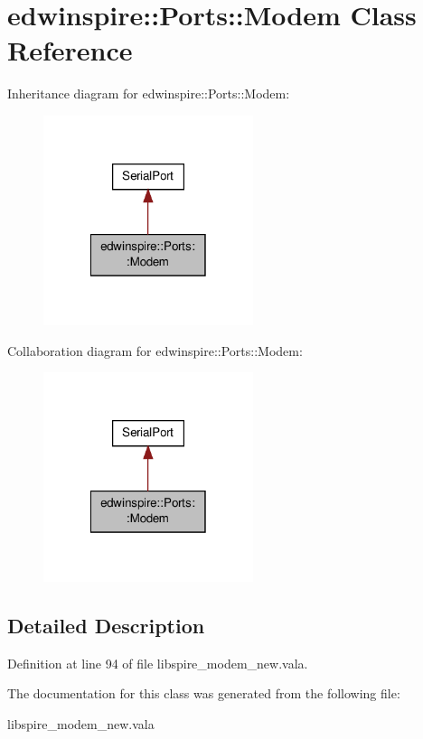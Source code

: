 \hypertarget{classedwinspire_1_1_ports_1_1_modem}{\section{edwinspire\-:\-:Ports\-:\-:Modem Class Reference}
\label{classedwinspire_1_1_ports_1_1_modem}
}


Inheritance diagram for edwinspire\-:\-:Ports\-:\-:Modem\-:\nopagebreak
\begin{figure}[H]
\begin{center}
\leavevmode
\includegraphics[width=174pt]{classedwinspire_1_1_ports_1_1_modem__inherit__graph}
\end{center}
\end{figure}


Collaboration diagram for edwinspire\-:\-:Ports\-:\-:Modem\-:\nopagebreak
\begin{figure}[H]
\begin{center}
\leavevmode
\includegraphics[width=174pt]{classedwinspire_1_1_ports_1_1_modem__coll__graph}
\end{center}
\end{figure}


\subsection{Detailed Description}


Definition at line 94 of file libspire\-\_\-modem\-\_\-new.\-vala.



The documentation for this class was generated from the following file\-:\begin{DoxyCompactItemize}
\item 
libspire\-\_\-modem\-\_\-new.\-vala\end{DoxyCompactItemize}

